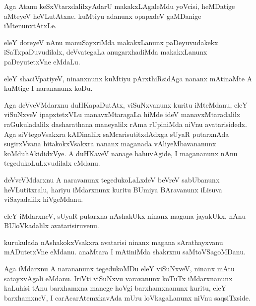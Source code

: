 \documentclass{article}
\begin{document}
\begin{mn}
Aga Atanu keSxVtarxdalilxyAdarU makakxLAgaleMdu yoVcisi, heMDatige
aMteyeV heVLutAtxne. kuMtiyu adanunx opapxdeV gaMDanige iMtenunxtAtxLe.
\end{mn}

\begin{mn}%
eleY doreyeV nAnu manuSayxriMda makakxLanunx paDeyuvudakekx
iSaTxpaDuvudilalx, deVvategaLa anugarxhadiMda makakxLanunx
paDeyutetxVne eMdaLu.
\end{mn}

\begin{mn}
eleY shaciVpatiyeV, ninanxnunx kuMtiyu pArxthiRsidAga nananx mAtinaMte
A kuMtige I narananunx koDu.
\end{mn}

\begin{mn}%
Aga deVveVMdarxnu duHKapaDutAtx, viSuNxvanunx kuritu iMteMdanu, eleY
viSuNxveV ipapxtetxVLu manavxMtaragaLa hiMde ideV manavxMtaradalilx
raGukuladalilx dasharathana maneyalilx rAma rUpiniMda niVnu
avatarisidedx. Aga siVtegoVsakxra kADinalilx saMcarisutitxdAdxga sUyaR
putarxnAda sugirxVvana hitakokxVsakxra nananx maganada
vAliyeMbavananunx koMduhAkididxVye. A duHKaveV nanage bahuvAgide, I
magananunx nAnu tegedukoLuLxvudilalx eMdanu.
\end{mn}

\begin{mn}%
deVveVMdarxnu A naravanunx tegedukoLaLxdeV beVreV sabUbanunx
heVLutitxralu, hariyu iMdarxnunx kuritu BUmiya BAravanunx iLisuva
viSayadalilx hiVgeMdanu.
\end{mn}

\begin{mn}
eleY iMdarxneV, sUyaR putarxna nAshakUkx ninanx magana jayakUkx, nAnu
BUloVkadalilx avatarisiruvenu.
\end{mn}

\begin{mn}
kurukulada nAshakokxVsakxra avatarisi ninanx magana sArathayxvanu
mADutetxVne eMdanu. anaMtara I mAtiniMda shakrxnu saMtoVSagoMDanu.
\end{mn}

\begin{mn}%
Aga iMdarxnu A narananunx tegedukoMDu eleY viSuNxveV, ninanx mAtu
satayxvAgali eMdanu. IriVti viSuNxvu varavanunx koTuTx iMdarxnanunx
kaLuhisi tAnu barxhamxna manege hoVgi barxhamxnanunx kuritu, eleY
barxhamxneV, I carAcarAtemxkavAda mUru loVkagaLanunx niVnu saqsiTxside.
\end{mn}
\end{document}
